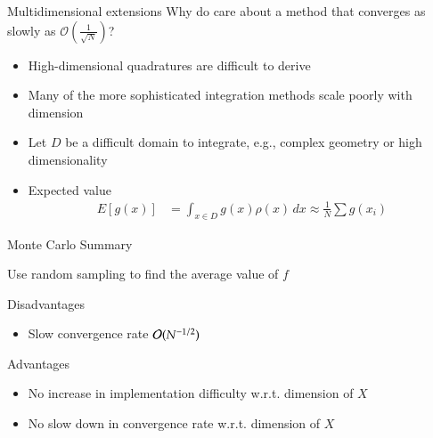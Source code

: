 \documentclass[10pt]{beamer}
\begin{document}
\begin{frame}{Multidimensional extensions}
Why do care about a method that converges as slowly as $\mathcal{O}(\frac{1}{\sqrt{N}})$? \bigskip 
\begin{itemize}
  \item High-dimensional quadratures are difficult to derive 
  \item Many of the more sophisticated integration methods scale poorly with dimension
  \item Let $D$ be a difficult domain to integrate, e.g., complex geometry or high dimensionality
  \item Expected value
  \begin{align*}
  E[g(x)] & = \int_{x\in D} g(x)\rho(x)\,d x \approx \frac{1}{N} \sum g(x_i)
  \end{align*}

  
  
\end{itemize}
\end{frame}


\begin{frame}{Monte Carlo Summary}

        {
        {Use random sampling to find the average value of $f$}
        }
        
        \begin{block}{Disadvantages}
        \begin{itemize}
            \item Slow convergence rate ${\mathcal{O}}(N^{-1/2})$
        \end{itemize}
        \end{block}
        \begin{block}{Advantages}
        \begin{itemize}
            \item No increase in implementation difficulty w.r.t. dimension of $X$
            \item No slow down in convergence rate w.r.t. dimension of $X$
        \end{itemize}
        \end{block}

\end{frame}
\end{document}
